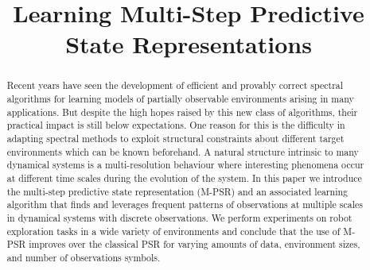 \documentclass{article}
\title{Learning Multi-Step Predictive State Representations}
\begin{document}
\maketitle

\begin{abstract}
Recent years have seen the development of efficient and provably correct spectral algorithms for learning models of partially observable environments arising in many applications. But despite the high hopes raised by this new class of algorithms, their practical impact is still below expectations. One reason for this is the difficulty in adapting spectral methods to exploit structural constraints about different target environments which can be known beforehand. A natural structure intrinsic to many dynamical systems is a multi-resolution behaviour where interesting phenomena occur at different time scales during the evolution of the system. In this paper we introduce the multi-step predictive state representation (M-PSR) and an associated learning algorithm that finds and leverages frequent patterns of observations at multiple scales in dynamical systems with discrete observations. We perform experiments on robot exploration tasks in a wide variety of environments and conclude that the use of M-PSR improves over the classical PSR for varying amounts of data, environment sizes, and number of observations symbols.
\end{abstract}









\end{document}
